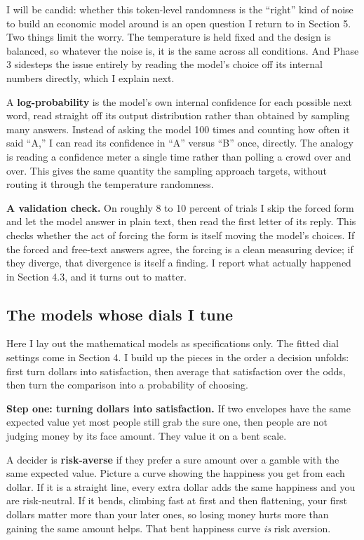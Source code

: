 \documentclass[11pt]{article}
\newcommand{\term}[1]{\textbf{\color{mossdk}#1}}
\begin{document}
I will be candid: whether this token-level randomness is the ``right'' kind of noise to build an
economic model around is an open question I return to in Section 5. Two things limit the worry. The
temperature is held fixed and the design is balanced, so whatever the noise is, it is the same across all
conditions. And Phase 3 sidesteps the issue entirely by reading the model's choice off its internal
numbers directly, which I explain next.

\begin{defbox}
A \term{log-probability} is the model's own internal confidence for each possible next word, read
straight off its output distribution rather than obtained by sampling many answers. Instead of asking
the model 100 times and counting how often it said ``A,'' I can read its confidence in ``A'' versus
``B'' once, directly. The analogy is reading a confidence meter a single time rather than polling a
crowd over and over. This gives the same quantity the sampling approach targets, without routing it
through the temperature randomness.
\end{defbox}

\textbf{A validation check.} On roughly 8 to 10 percent of trials I skip the forced form and let the
model answer in plain text, then read the first letter of its reply. This checks whether the act of
forcing the form is itself moving the model's choices. If the forced and free-text answers agree, the
forcing is a clean measuring device; if they diverge, that divergence is itself a finding. I report what
actually happened in Section 4.3, and it turns out to matter.

\subsection{The models whose dials I tune}

Here I lay out the mathematical models as specifications only. The fitted dial settings come in
Section 4. I build up the pieces in the order a decision unfolds: first turn dollars into satisfaction,
then average that satisfaction over the odds, then turn the comparison into a probability of choosing.

\textbf{Step one: turning dollars into satisfaction.} If two envelopes have the same expected value yet
most people still grab the sure one, then people are not judging money by its face amount. They value it
on a bent scale.

\begin{defbox}
A decider is \term{risk-averse} if they prefer a sure amount over a gamble with the same expected value.
Picture a curve showing the happiness you get from each dollar. If it is a straight line, every extra
dollar adds the same happiness and you are risk-neutral. If it bends, climbing fast at first and then
flattening, your first dollars matter more than your later ones, so losing money hurts more than gaining
the same amount helps. That bent happiness curve \emph{is} risk aversion.
\end{defbox}
\end{document}
